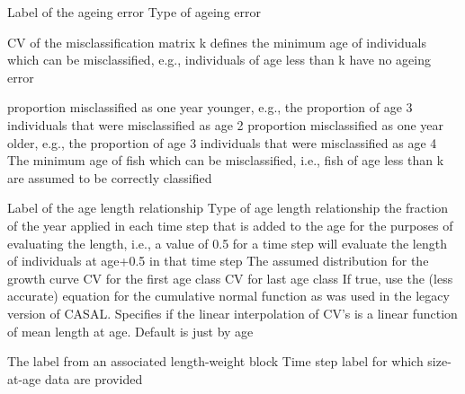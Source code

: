  {Label of the ageing error}
 {Type of ageing error}
\par\textbf{}\par
\par\textbf{}\par
\par\textbf{}\par
{} {CV of the misclassification matrix}
 {k defines the minimum age of individuals which can be misclassified, e.g., individuals of age less than k have no ageing error}
\par\textbf{}\par
{} {proportion misclassified as one year younger, e.g., the proportion of age 3 individuals that were misclassified as age 2}
 {proportion misclassified as one year older, e.g., the proportion of age 3 individuals that were misclassified as age 4}
 {The minimum age of fish which can be misclassified, i.e., fish of age less than k are assumed to be correctly classified}
\par\par
{} {Label of the age length relationship}
 {Type of age length relationship}
 {the fraction of the year applied in each time step that is added to the age for the purposes of evaluating the length, i.e., a value of 0.5 for a time step will evaluate the length of individuals at age+0.5 in that time step}
 {The assumed distribution for the growth curve}
 {CV for the first age class}
 {CV for last age class}
 {If true, use the (less accurate) equation for the cumulative normal function as was used in the legacy version of CASAL.}
 {Specifies if the linear interpolation of CV's is a linear function of mean length at age. Default is just by age}
\par\textbf{}\par
{} {}
 {}
 {The label from an associated length-weight block}
 {Time step label for which size-at-age data are provided}
\par\textbf{}\par

